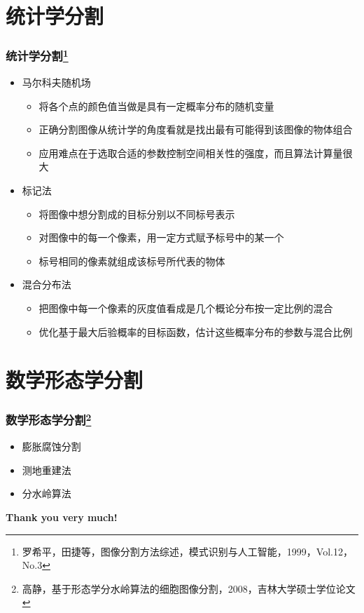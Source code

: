 \documentclass[notheorems,mathserif,table,compress]{beamer}  %
\begin{document}
\section{统计学分割}
\begin{frame}
   \frametitle{统计学分割\footnote{罗希平，田捷等，图像分割方法综述，模式识别与人工智能，1999，Vol.12，No.3}}
   \begin{itemize}
   \item 马尔科夫随机场
       \begin{itemize}
       \item 将各个点的颜色值当做是具有一定概率分布的随机变量
       \item 正确分割图像从统计学的角度看就是找出最有可能得到该图像的物体组合
       \item 应用难点在于选取合适的参数控制空间相关性的强度，而且算法计算量很大
       \end{itemize}
   \item 标记法
       \begin{itemize}
       \item 将图像中想分割成的目标分别以不同标号表示
       \item 对图像中的每一个像素，用一定方式赋予标号中的某一个
       \item 标号相同的像素就组成该标号所代表的物体
       \end{itemize}
   \item 混合分布法
       \begin{itemize}
       \item 把图像中每一个像素的灰度值看成是几个概论分布按一定比例的混合
       \item 优化基于最大后验概率的目标函数，估计这些概率分布的参数与混合比例
       \end{itemize}
   \end{itemize}
\end{frame}

\section{数学形态学分割}
\begin{frame}
   \frametitle{数学形态学分割\footnote{高静，基于形态学分水岭算法的细胞图像分割，2008，吉林大学硕士学位论文}}
   \begin{itemize}
   \item 膨胀腐蚀分割
   \item 测地重建法
   \item 分水岭算法
   \end{itemize}
\end{frame}

\begin{frame}
   \begin{Huge}
   \textbf{Thank you very much!}
   \end{Huge}
\end{frame}
\end{document}

